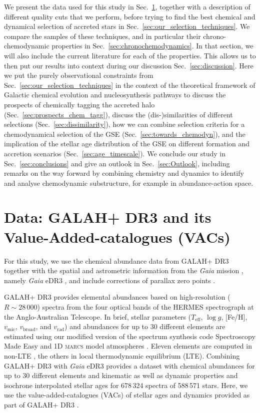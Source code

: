 \documentclass[fleqn,usenatbib]{mnras}
\newcommand{\Gaia}{\textit{Gaia}\xspace} %
\begin{document}
We present the data used for this study in Sec.~\ref{sec:data}, together with a description of different quality cuts that we perform, before trying to find the best chemical and dynamical selection of accreted stars in Sec.~\ref{sec:our_selection_techniques}. We compare the samples of these techniques, and in particular their chrono-chemodynamic properties in Sec.~\ref{sec:chronochemodynamics}. In that section, we will also include the current literature for each of the properties. This allows us to then put our results into context during our discussion Sec.~\ref{sec:discussion}. Here we put the purely observational constraints from Sec.~\ref{sec:our_selection_techniques} in the context of the theoretical framework of Galactic chemical evolution and nucleosynthesis pathways to discuss the prospects of chemically tagging the accreted halo (Sec.~\ref{sec:prospects_chem_tagg}), discuss the (dis-)similarities of different selections (Sec.~\ref{sec:dissimilarity}), how we can combine selection criteria for a chemodynamical selection of the GSE (Sec.~\ref{sec:towards_chemodyn}), and the implication of the stellar age distribution of the GSE on different formation and accretion scenarios (Sec.~\ref{sec:age_timescale}). We conclude our study in Sec.~\ref{sec:conclusions} and give an outlook in Sec.~\ref{sec:Outlook}, including remarks on the way forward by combining chemistry and dynamics to identify and analyse chemodynamic substructure, for example in abundance-action space.

\section{Data: GALAH+ DR3 and its Value-Added-catalogues (VACs)} \label{sec:data}

For this study, we use the chemical abundance data from GALAH+ DR3 \citep{Buder2021} together with the spatial and astrometric information from the \Gaia mission \citep{Gaia-Collaboration2016}, namely \Gaia eDR3 \citep{Brown2021}, and include  corrections of parallax zero points \citep{Lindegren2021a, Lindegren2021b}.

GALAH+ DR3 provides elemental abundances based on high-resolution ($R \sim 28\,000$) spectra from the four optical bands of the HERMES spectrograph \citep{Sheinis2015} at the Anglo-Australian Telescope. In brief, stellar parameters ($T_\text{eff}$, $\log g$, [Fe/H], $v_\text{mic}$, $v_\text{broad}$, and $v_\text{rad}$) and abundances for up to 30 different elements are estimated using our modified version of the spectrum synthesis code Spectroscopy Made Easy \citep[\textsc{sme}][]{Valenti1996, Piskunov2017} and 1D \textsc{marcs} model atmospheres \citep{Gustafsson2008}. Eleven elements are computed in non-LTE \citep{Amarsi2020}, the others in local thermodynamic equilibrium (LTE). Combining GALAH+ DR3 with \Gaia eDR3 provides a dataset with chemical abundances for up to 30 different elements and kinematic as well as dynamic properties and isochrone interpolated stellar ages for 678\,324 spectra of 588\,571 stars. Here, we use the value-added-catalogues (VACs) of stellar ages and dynamics provided as part of GALAH+ DR3 \citep{Buder2021}. 
\end{document}
